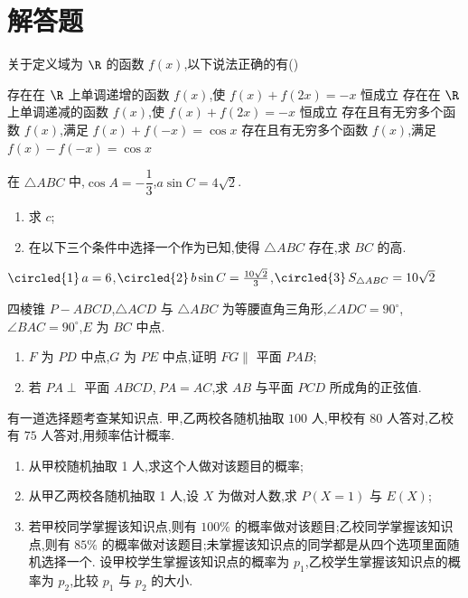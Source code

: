 \section{解答题}

\begin{problem}
关于定义域为 \(\R\) 的函数 \(f(x)\),以下说法正确的有(\quad)

\choices
    {存在在 \(\R\) 上单调递增的函数 \(f(x)\),使 \(f(x)+f(2x)=-x\) 恒成立}
    {存在在 \(\R\) 上单调递减的函数 \(f(x)\),使 \(f(x)+f(2x)=-x\) 恒成立}
    {存在且有无穷多个函数 \(f(x)\),满足 \(f(x)+f(-x)=\cos x\)}
    {存在且有无穷多个函数 \(f(x)\),满足 \(f(x)-f(-x)=\cos x\)}
\end{problem}

\begin{problem}
在 \(\triangle ABC\) 中,\(\cos A=-\dfrac13\),\(a\sin C=4\sqrt2\).

\begin{enumerate}
\item 求 \(c\);

\item 在以下三个条件中选择一个作为已知,使得 \(\triangle ABC\) 存在,求 \(BC\) 的高.
\end{enumerate}

\(\text{\circled{1}} \, a=6\),\(\text{\circled{2}} \, b\sin C= \frac{10\sqrt2}{3}\),\(\text{\circled{3}} \, S_{\triangle ABC}=10\sqrt2\)
\end{problem}

\begin{problem}
四棱锥 \(P-ABCD\),\(\triangle ACD\) 与 \(\triangle ABC\) 为等腰直角三角形,\(\angle ADC=90^\circ\),\(\angle BAC=90^\circ\),\(E\) 为 \(BC\) 中点.

\begin{enumerate}
\item \(F\) 为 \(PD\) 中点,\(G\) 为 \(PE\) 中点,证明 \(FG\parallel\) 平面 \(PAB\);

\item 若 \(PA\perp\) 平面 \(ABCD\),\(\ PA=AC\),求 \(AB\) 与平面 \(PCD\) 所成角的正弦值.
\end{enumerate}
\end{problem}

\begin{problem}
有一道选择题考查某知识点. 甲,乙两校各随机抽取 \(100\) 人,甲校有 \(80\) 人答对,乙校有 \(75\) 人答对,用频率估计概率.

\begin{enumerate}
    \item 从甲校随机抽取 1 人,求这个人做对该题目的概率;
    \item 从甲乙两校各随机抽取 1 人,设 \(X\) 为做对人数,求 \(P(X=1)\) 与 \(E(X)\);
    \item 若甲校同学掌握该知识点,则有 \(100\%\) 的概率做对该题目;乙校同学掌握该知识点,则有 \(85\%\) 的概率做对该题目;未掌握该知识点的同学都是从四个选项里面随机选择一个. 设甲校学生掌握该知识点的概率为 \(p_1\),乙校学生掌握该知识点的概率为 \(p_2\),比较 \(p_1\) 与 \(p_2\) 的大小.
\end{enumerate}
\end{problem}

